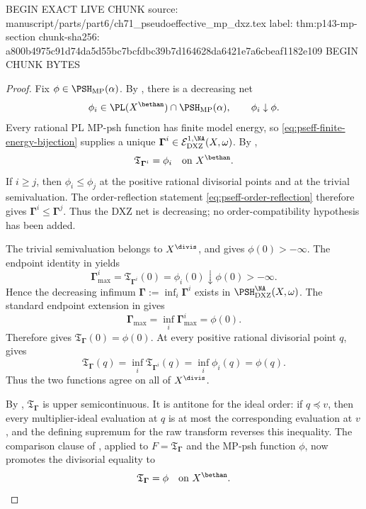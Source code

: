 BEGIN EXACT LIVE CHUNK
source: manuscript/parts/part6/ch71_pseudoeffective_mp_dxz.tex
label: thm:p143-mp-section
chunk-sha256: a800b4975c91d74da5d55bc7bcfdbc39b7d164628da6421e7a6cbeaf1182e109
BEGIN CHUNK BYTES
\begin{proof}
Fix \(\phi\in\PSH_{\mathrm{MP}}(\alpha)\).  By
, there is a decreasing net
\[
 \phi_i\in\PL(X^{\bethan})\cap\PSH_{\mathrm{MP}}(\alpha),
 \qquad \phi_i\downarrow\phi.
\]
Every rational PL MP-psh function has finite model energy, so
\eqref{eq:pseff-finite-energy-bijection} supplies a unique
\(\boldsymbol\Gamma^i\in
\mathcal E^{1,\NA}_{\mathrm{DXZ}}(X,\omega)\).  By
,
\[
                 \mathfrak T_{\boldsymbol\Gamma^i}=\phi_i
                 \quad\text{on }X^{\bethan}.
\]
If \(i\geq j\), then \(\phi_i\leq\phi_j\) at the positive rational
divisorial points and at the trivial semivaluation.  The order-reflection
statement \eqref{eq:pseff-order-reflection} therefore gives
\(\boldsymbol\Gamma^i\leq\boldsymbol\Gamma^j\).  Thus the DXZ net is
decreasing; no order-compatibility hypothesis has been added.

The trivial semivaluation belongs to \(X^{\divis}\), and
 gives \(\phi(0)>-\infty\).  The endpoint
identity in  yields
\[
 \boldsymbol\Gamma^i_{\max}
   =\mathfrak T_{\boldsymbol\Gamma^i}(0)
   =\phi_i(0)\downarrow\phi(0)>-\infty.
\]
Hence the decreasing infimum
\(\boldsymbol\Gamma:=\inf_i\boldsymbol\Gamma^i\) exists in
\(\PSH^{\NA}_{\mathrm{DXZ}}(X,\omega)\).  The standard endpoint extension
in  gives
\[
 \boldsymbol\Gamma_{\max}
   =\inf_i\boldsymbol\Gamma^i_{\max}
   =\phi(0).
\]
Therefore  gives
\(\mathfrak T_{\boldsymbol\Gamma}(0)=\phi(0)\).  At every positive
rational divisorial point \(q\),  gives
\[
 \mathfrak T_{\boldsymbol\Gamma}(q)
   =\inf_i\mathfrak T_{\boldsymbol\Gamma^i}(q)
   =\inf_i\phi_i(q)
   =\phi(q).
\]
Thus the two functions agree on all of \(X^{\divis}\).

By
,
\(\mathfrak T_{\boldsymbol\Gamma}\) is upper semicontinuous.  It is
antitone for the ideal order: if \(q\preceq v\), then every multiplier-ideal
evaluation at \(q\) is at most the corresponding evaluation at \(v\), and
the defining supremum for the raw transform reverses this inequality.
The comparison clause of ,
applied to \(F=\mathfrak T_{\boldsymbol\Gamma}\) and the MP-psh function
\(\phi\), now promotes the divisorial equality to
\[
                 \mathfrak T_{\boldsymbol\Gamma}=\phi
                 \quad\text{on }X^{\bethan}.
\]


\end{proof}
